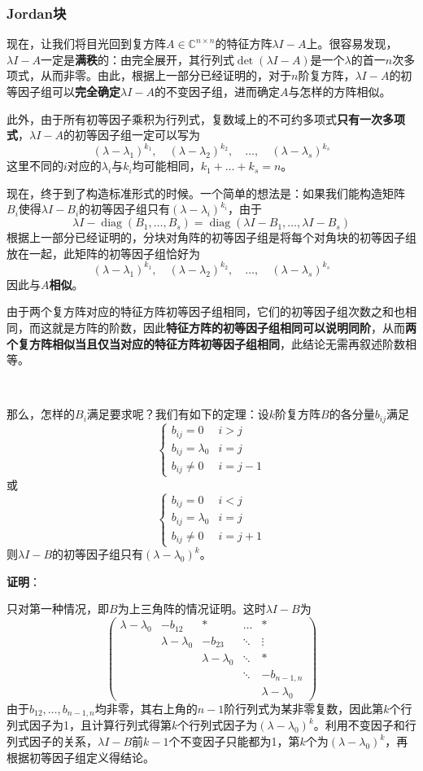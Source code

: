 \documentclass[a4paper,UTF8,fontset=windows,AutoFakeBold]{ctexart}
\DeclareMathOperator{\diag}{diag}
\newcommand*{\note}{\noindent *}
\newcommand{\proo}[1]{{\vspace{5pt}\kaishu\noindent\textbf{证明}：\vspace{-3pt}
\begin{compactitem}
    \item[] #1
\end{compactitem}
}}
\begin{document}
\subsubsection{Jordan块}
现在，让我们将目光回到复方阵$A\in\mathbb{C}^{n\times n}$的特征方阵$\lambda I-A$上。很容易发现，$\lambda I-A$一定是\textbf{满秩}的：由完全展开，其行列式$\det(\lambda I-A)$是一个$\lambda$的首一$n$次多项式，从而非零。由此，根据上一部分已经证明的，对于$n$阶复方阵，$\lambda I-A$的初等因子组可以\textbf{完全确定}$\lambda I-A$的不变因子组，进而确定$A$与怎样的方阵相似。

此外，由于所有初等因子乘积为行列式，复数域上的不可约多项式\textbf{只有一次多项式}，$\lambda I-A$的初等因子组一定可以写为
$$(\lambda-\lambda_1)^{k_1},\quad(\lambda-\lambda_2)^{k_2},\quad\dots,\quad(\lambda-\lambda_s)^{k_s}$$
这里不同的$i$对应的$\lambda_i$与$k_i$均可能相同，$k_1+\dots+k_s=n$。

现在，终于到了构造标准形式的时候。一个简单的想法是：如果我们能构造矩阵$B_i$使得$\lambda I-B_i$的初等因子组只有$(\lambda-\lambda_i)^{k_i}$，由于
$$\lambda I-\diag(B_1,\dots,B_s)=\diag(\lambda I-B_1,\dots,\lambda I-B_s)$$
根据上一部分已经证明的，分块对角阵的初等因子组是将每个对角块的初等因子组放在一起，此矩阵的初等因子组恰好为
$$(\lambda-\lambda_1)^{k_1},\quad(\lambda-\lambda_2)^{k_2},\quad\dots,\quad(\lambda-\lambda_s)^{k_s}$$
因此与$A$\textbf{相似}。

\note 由于两个复方阵对应的特征方阵初等因子组相同，它们的初等因子组次数之和也相同，而这就是方阵的阶数，因此\textbf{特征方阵的初等因子组相同可以说明同阶}，从而\textbf{两个复方阵相似当且仅当对应的特征方阵初等因子组相同}，此结论无需再叙述阶数相等。

\

那么，怎样的$B_i$满足要求呢？我们有如下的定理：设$k$阶复方阵$B$的各分量$b_{ij}$满足
$$\begin{cases}b_{ij}=0&i>j\\b_{ij}=\lambda_0&i=j\\b_{ij}\ne 0&i=j-1\end{cases}$$
或
$$\begin{cases}b_{ij}=0&i<j\\b_{ij}=\lambda_0&i=j\\b_{ij}\ne 0&i=j+1\end{cases}$$
则$\lambda I-B$的初等因子组只有$(\lambda-\lambda_0)^k$。

\proo{
    只对第一种情况，即$B$为上三角阵的情况证明。这时$\lambda I-B$为
    $$\begin{pmatrix}\lambda-\lambda_0&-b_{12}&*&\dots&*\\ &\lambda-\lambda_0&-b_{23}&\ddots&\vdots\\ &&\lambda-\lambda_0&\ddots&*\\ &&&\ddots&-b_{n-1,n}\\ &&&&\lambda-\lambda_0\end{pmatrix}$$
    由于$b_{12},\dots,b_{n-1,n}$均非零，其右上角的$n-1$阶行列式为某非零复数，因此第$k$个行列式因子为1，且计算行列式得第$k$个行列式因子为$(\lambda-\lambda_0)^k$。利用不变因子和行列式因子的关系，$\lambda I-B$前$k-1$个不变因子只能都为1，第$k$个为$(\lambda-\lambda_0)^k$，再根据初等因子组定义得结论。
}
\end{document}
